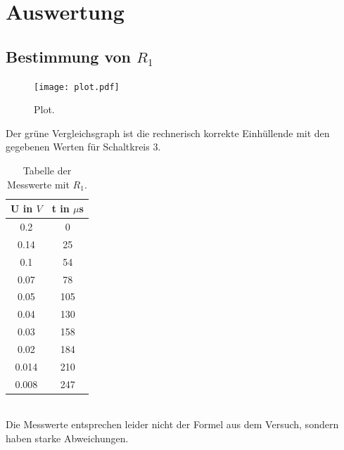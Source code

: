 \section{Auswertung}
\label{sec:Auswertung}

\subsection{Bestimmung von \(R_1\)}
\begin{figure}
  \centering
  \texttt{[image: plot.pdf]}
  \caption{Plot.}
  \label{fig:plot}
\end{figure}
Der grüne Vergleichsgraph ist die rechnerisch korrekte Einhüllende mit den gegebenen Werten für Schaltkreis 3.
\begin{table}[htp]
  \centering
  \caption{Tabelle der Messwerte mit \(R_1\).}
  \label{tab:tab1}
  \begin{tabular}{c c}
    \toprule
    U in $V$ & t in $\mu$s\\
    \midrule
    0.2 & 0\\
    0.14 & 25\\
    0.1 & 54\\
    0.07 & 78\\
    0.05 & 105\\
    0.04 & 130\\
    0.03 & 158\\
    0.02 & 184\\
    0.014 & 210\\
    0.008 & 247\\
    \bottomrule
  \end{tabular}
\end{table}
\\
Die Messwerte entsprechen leider nicht der Formel aus dem Versuch, sondern haben starke Abweichungen.

\newpage
